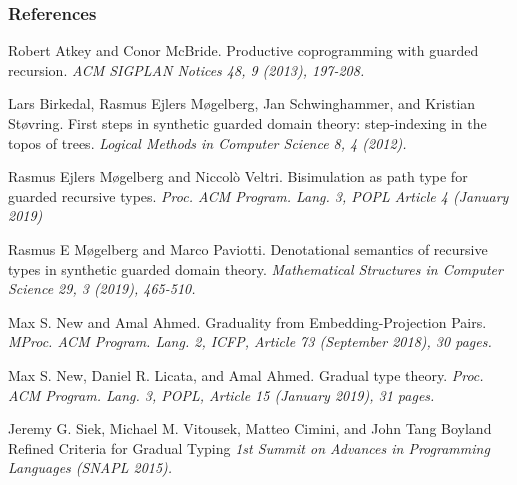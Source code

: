 \documentclass[
	11pt, %
]{beamer}
\begin{document}
\begin{frame}[allowframebreaks] %
	\frametitle{References}
	
	\begin{thebibliography}{99} %
		\footnotesize %
		
			
			Robert Atkey and Conor McBride.
			\newblock Productive coprogramming with guarded recursion.
			\newblock \emph{ACM SIGPLAN Notices 48, 9 (2013), 197-208. }

			Lars Birkedal, Rasmus Ejlers Møgelberg, Jan Schwinghammer, and Kristian Støvring.			
			\newblock First steps in synthetic guarded domain theory: step-indexing in the topos of trees.
			\newblock \emph{Logical Methods in Computer Science 8, 4 (2012). }

			Rasmus Ejlers Møgelberg and Niccolò Veltri.
			\newblock Bisimulation as path type for guarded recursive types.
			\newblock \emph{Proc. ACM Program. Lang. 3, POPL Article 4 (January 2019)}

			Rasmus E Møgelberg and Marco Paviotti.		
			\newblock Denotational semantics of recursive types in synthetic guarded domain theory.
			\newblock \emph{Mathematical Structures in Computer Science 29, 3 (2019), 465-510.  }

			Max S. New and Amal Ahmed.		
			\newblock Graduality from Embedding-Projection Pairs. 
			\newblock \emph{MProc. ACM Program. Lang. 2, ICFP, Article 73 (September 2018), 30 pages. }

			Max S. New, Daniel R. Licata, and Amal Ahmed.
			\newblock Gradual type theory. 
			\newblock \emph{Proc. ACM Program. Lang. 3, POPL, Article 15 (January 2019), 31 pages. }

			Jeremy G. Siek, Michael M. Vitousek, Matteo Cimini, and John Tang Boyland
			\newblock Refined Criteria for Gradual Typing
			\newblock \emph{1st Summit on Advances in Programming Languages (SNAPL 2015). }

		
		

	\end{thebibliography}
\end{frame}
\end{document}
